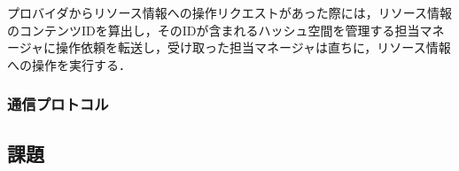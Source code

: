 プロバイダからリソース情報への操作リクエストがあった際には，リソース情報のコンテンツIDを算出し，そのIDが含まれるハッシュ空間を管理する担当マネージャに操作依頼を転送し，受け取った担当マネージャは直ちに，リソース情報への操作を実行する．




\subsubsection{通信プロトコル}
\subsection{課題}
